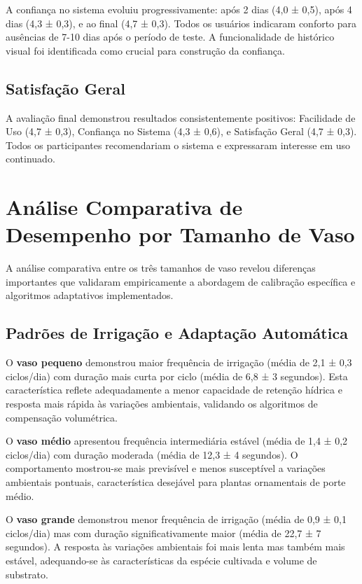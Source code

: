 \documentclass[oneside,english,brazilian]{UNISINOSmonografia}
\begin{document}
A confiança no sistema evoluiu progressivamente: após 2 dias (4,0 ± 0,5), após 4 dias (4,3 ± 0,3), e ao final (4,7 ± 0,3). Todos os usuários indicaram conforto para ausências de 7-10 dias após o período de teste. A funcionalidade de histórico visual foi identificada como crucial para construção da confiança.

\subsection{Satisfação Geral}

A avaliação final demonstrou resultados consistentemente positivos: Facilidade de Uso (4,7 ± 0,3), Confiança no Sistema (4,3 ± 0,6), e Satisfação Geral (4,7 ± 0,3). Todos os participantes recomendariam o sistema e expressaram interesse em uso continuado.

\section{Análise Comparativa de Desempenho por Tamanho de Vaso}

A análise comparativa entre os três tamanhos de vaso revelou diferenças importantes que validaram empiricamente a abordagem de calibração específica e algoritmos adaptativos implementados.

\subsection{Padrões de Irrigação e Adaptação Automática}

O \textbf{vaso pequeno} demonstrou maior frequência de irrigação (média de 2,1 ± 0,3 ciclos/dia) com duração mais curta por ciclo (média de 6,8 ± 3 segundos). Esta característica reflete adequadamente a menor capacidade de retenção hídrica e resposta mais rápida às variações ambientais, validando os algoritmos de compensação volumétrica.

O \textbf{vaso médio} apresentou frequência intermediária estável (média de 1,4 ± 0,2 ciclos/dia) com duração moderada (média de 12,3 ± 4 segundos). O comportamento mostrou-se mais previsível e menos susceptível a variações ambientais pontuais, característica desejável para plantas ornamentais de porte médio.

O \textbf{vaso grande} demonstrou menor frequência de irrigação (média de 0,9 ± 0,1 ciclos/dia) mas com duração significativamente maior (média de 22,7 ± 7 segundos). A resposta às variações ambientais foi mais lenta mas também mais estável, adequando-se às características da espécie cultivada e volume de substrato.
\end{document}
